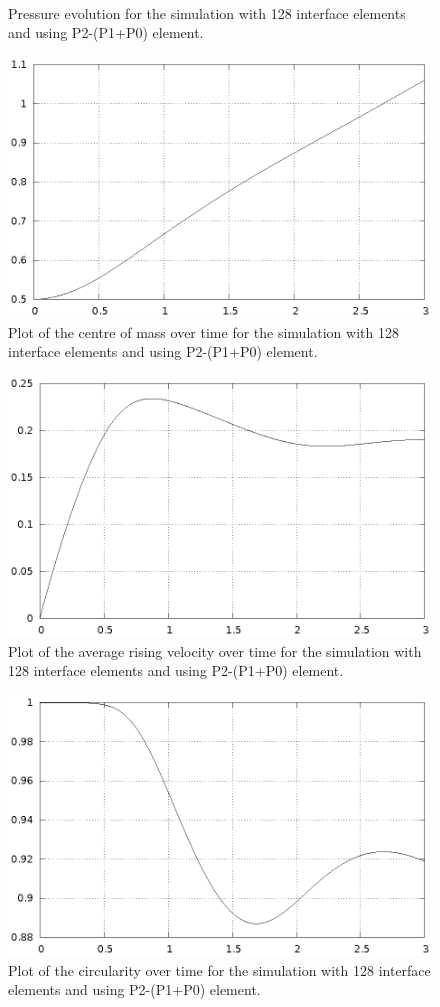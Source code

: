 \documentclass[a4paper,12pt,onecolumn]{article}
\begin{document}
\begin{figure}[htbp]
\centering
{}
 \\
\caption{Pressure evolution for the simulation with 128 interface elements and
using P2-(P1+P0) element.}
\label{fig:2d_benchmark1_pressure}
\end{figure}
\begin{figure}[htbp]
\centering
\includegraphics[width=.45\textwidth]
{figures/2d_benchmark1_barycenter_p1p0_128.ps}
\caption{Plot of the centre of mass over time for the simulation with 128
interface elements and using P2-(P1+P0) element.}
\label{fig:2d_benchmark1_barycenter}
\end{figure}

\begin{figure}[htbp]
\centering
\includegraphics[width=.45\textwidth]
{figures/2d_benchmark1_velocity_p1p0_128.ps}
\caption{Plot of the average rising velocity over time for the simulation
with 128 interface elements and using P2-(P1+P0) element.}
\label{fig:2d_benchmark1_velocity}
\end{figure}

\begin{figure}[htbp]
\centering
\includegraphics[width=.45\textwidth]
{figures/2d_benchmark1_circularity_p1p0_128.ps}
\caption{Plot of the circularity over time for the simulation with 128
interface elements and using P2-(P1+P0) element.}
\label{fig:2d_benchmark1_circularity}
\end{figure}
\end{document}
